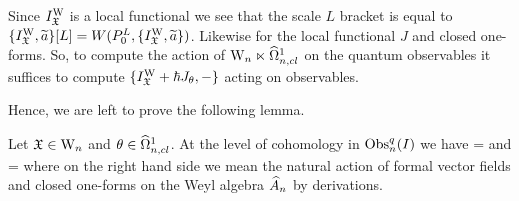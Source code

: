 Since $I_\mathfrak X^{\rm W}$ is a local functional we see that the scale $L$
bracket is equal
to $\{I_\mathfrak X^{\rm W}, \widetilde{a}\}[L] = W(P_0^L, \{I_\mathfrak X^{\rm W},
\widetilde{a}\})$. Likewise for the local functional $J$ and closed
one-forms. So, to compute the action of ${{\rm W}_n} \ltimes \widehat{\Omega}^1_{n,cl}$ on the
quantum observables it suffices to compute $\{I_\mathfrak X^{\rm W} + \hbar
J_\theta , -\}$ acting on observables.

Hence, we are left to prove the following lemma.

\begin{lem} Let $\mathfrak X \in {{\rm W}_n}$ and $\theta \in \widehat{\Omega}^1_{n,cl}$. At the level of cohomology in ${\rm Obs}^q_n(I)$ we have
\ben
\left[ \{I_\fX^{\rm W}, a\} \right] = \fX \cdot [a]
\een
and 
\ben
{} = \theta \cdot [a]
\een
where on the right hand side we mean the natural action of formal
vector fields and closed one-forms on the Weyl algebra $\widehat{A}_n$ by derivations. 
\end{lem}
